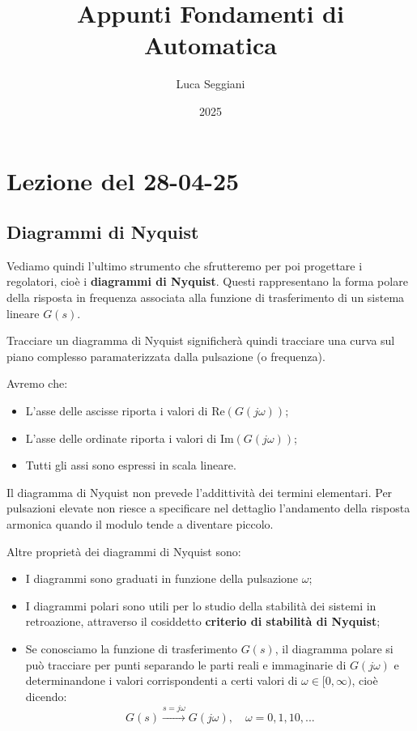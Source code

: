 \documentclass[a4paper,11pt]{article}
\title{Appunti Fondamenti di Automatica}
\author{Luca Seggiani}
\date{2025}
\begin{document}
\section{Lezione del 28-04-25}

\thispagestyle{empty}
\pagestyle{fancy}

\subsection{Diagrammi di Nyquist}
Vediamo quindi l'ultimo strumento che sfrutteremo per poi progettare i regolatori, cioè i \textbf{diagrammi di Nyquist}.
Questi rappresentano la forma polare della risposta in frequenza associata alla funzione di trasferimento di un sistema lineare $G(s)$.

Tracciare un diagramma di Nyquist significherà quindi tracciare una curva sul piano complesso paramaterizzata dalla pulsazione (o frequenza).

Avremo che:
\begin{itemize}
	\item L'asse delle ascisse riporta i valori di $\mathrm{Re}\left( G(j \omega) \right)$;
	\item L'asse delle ordinate riporta i valori di $\mathrm{Im}\left( G(j \omega) \right)$;
	\item Tutti gli assi sono espressi in scala lineare.
\end{itemize}

Il diagramma di Nyquist non prevede l'addittività dei termini elementari.
Per pulsazioni elevate non riesce a specificare nel dettaglio l'andamento della risposta armonica quando il modulo tende a diventare piccolo.

Altre proprietà dei diagrammi di Nyquist sono:
\begin{itemize}
	\item I diagrammi sono graduati in funzione della pulsazione $\omega$;
	\item I diagrammi polari sono utili per lo studio della stabilità dei sistemi in retroazione, attraverso il cosiddetto \textbf{criterio di stabilità di Nyquist};
	\item Se conosciamo la funzione di trasferimento $G(s)$, il diagramma polare si può tracciare per punti separando le parti reali e immaginarie di $G(j\omega)$ e determinandone i valori corrispondenti a certi valori di $\omega \in [0, \infty)$, cioè dicendo:
		$$
		G(s) \xrightarrow{s = j\omega} G(j\omega), \quad \omega = 0, 1, 10, ...
		$$
\end{itemize}
\end{document}
